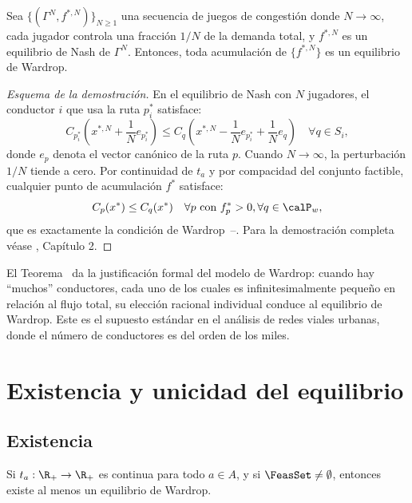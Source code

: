 \begin{theorem}\label{thm:wardrop_nash}
Sea $\{(\Gamma^N, f^{*,N})\}_{N \geq 1}$ una secuencia de juegos de congestión donde $N \to \infty$, cada jugador controla una fracción $1/N$ de la demanda total, y $f^{*,N}$ es un equilibrio de Nash de $\Gamma^N$. Entonces, toda acumulación de $\{f^{*,N}\}$ es un equilibrio de Wardrop.
\end{theorem}

\begin{proof}[Esquema de la demostración]
En el equilibrio de Nash con $N$ jugadores, el conductor $i$ que usa la ruta $p^*_i$ satisface:
\[
C_{p^*_i}\left(x^{*,N} + \frac{1}{N} e_{p^*_i}\right) \leq C_q\left(x^{*,N} - \frac{1}{N} e_{p^*_i} + \frac{1}{N} e_q\right) \quad \forall q \in S_i,
\]
donde $e_p$ denota el vector canónico de la ruta $p$. Cuando $N \to \infty$, la perturbación $1/N$ tiende a cero. Por continuidad de $t_a$ y por compacidad del conjunto factible, cualquier punto de acumulación $f^*$ satisface:
\[
C_{p}(x^*) \leq C_q(x^*) \quad \forall p \text{ con } f_p^* > 0, \forall q \in \calP_w,
\]
que es exactamente la condición de Wardrop~--. Para la demostración completa véase \cite{Roughgarden2005}, Capítulo 2.
\end{proof}

\begin{remark}
El Teorema~ da la justificación formal del modelo de Wardrop: cuando hay ``muchos'' conductores, cada uno de los cuales es infinitesimalmente pequeño en relación al flujo total, su elección racional individual conduce al equilibrio de Wardrop. Este es el supuesto estándar en el análisis de redes viales urbanas, donde el número de conductores es del orden de los miles.
\end{remark}

\section{Existencia y unicidad del equilibrio}

\subsection{Existencia}

\begin{theorem}\label{thm:existence}
Si $t_a : \R_+ \to \R_+$ es continua para todo $a \in A$, y si $\FeasSet \neq \emptyset$, entonces existe al menos un equilibrio de Wardrop.
\end{theorem}

